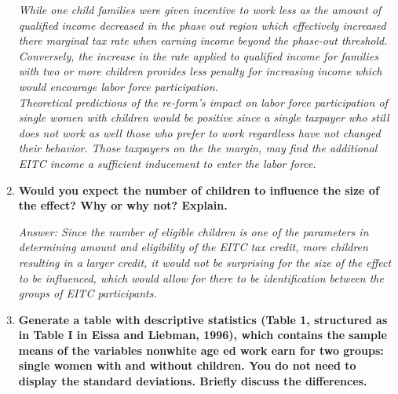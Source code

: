 \documentclass{article}
\begin{document}
\begin{enumerate}
\textit{While one child families were given incentive to work less as the amount of qualified income decreased in the phase out region which effectively increased there marginal tax rate when earning income beyond the phase-out threshold. Conversely, the increase in the rate applied to qualified income for families with two or more children provides less penalty for increasing income which would encourage labor force participation. } \\

\textit{Theoretical predictions of the re-form's impact on labor force participation of single women with children would be positive since a single taxpayer who still does not work as well those who prefer to work regardless have not changed their behavior. Those taxpayers on the the margin, may find the additional EITC income a sufficient inducement to enter the labor force.}


\item \textbf{Would you expect the number of children to influence the size of the effect? Why or why not? Explain.}

\textit{Answer: Since the number of eligible children is one of the parameters in  determining amount and eligibility of the EITC tax credit, more children resulting in a larger credit, it would not be surprising for the size of the effect to be influenced, which would allow for there to be identification between the groups of EITC participants. }

\item \textbf{Generate a table with descriptive statistics (Table 1, structured as in Table I in Eissa and Liebman, 1996), which contains the sample means of the variables nonwhite age ed work earn for two groups: single women with and without children. You do not need to display the standard deviations. Briefly discuss the differences.}


\end{enumerate}
\end{document}
